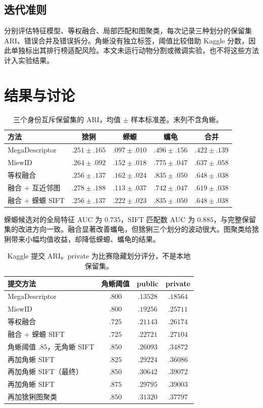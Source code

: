 \documentclass[UTF8,a4paper,10pt]{ctexart}
\begin{document}
\subsection{迭代准则}
分别评估特征模型、等权融合、局部匹配和图聚类，每次记录三种划分的保留集 ARI、错误合并及错误拆分。角蜥没有独立标签，阈值比较借助 Kaggle 分数，因此单独标出其排行榜适配风险。本文未运行动物分割或微调实验，也不将这些方法计入实验结果。

\section{结果与讨论}
\begin{table}[ht]
\centering
\caption{三个身份互斥保留集的 ARI，均值 $\pm$ 样本标准差。末列不含角蜥。}
\small
\begin{tabular}{lcccc}
\toprule
方法 & 猞猁 & 蝾螈 & 蠵龟 & 合并 \\
\midrule
MegaDescriptor & $.251\pm.165$ & $.097\pm.010$ & $.496\pm.156$ & $.422\pm.139$ \\
MiewID & $.264\pm.092$ & $.152\pm.018$ & $.775\pm.047$ & $.637\pm.058$ \\
等权融合 & $.256\pm.137$ & $.162\pm.024$ & $.835\pm.050$ & $.648\pm.038$ \\
融合 + 互近邻图 & $.278\pm.188$ & $.113\pm.037$ & $.742\pm.047$ & $.619\pm.038$ \\
融合 + 蝾螈 SIFT & $.256\pm.137$ & $.222\pm.023$ & $.835\pm.050$ & $.648\pm.038$ \\
\bottomrule
\end{tabular}
\end{table}

蝾螈候选对的全局特征 AUC 为 $0.735$，SIFT 匹配数 AUC 为 $0.885$，与完整保留集的改进方向一致。融合显著改善蠵龟，但猞猁三个划分的波动很大。图聚类给猞猁带来小幅均值收益，却降低蝾螈、蠵龟的结果。

\begin{table}[ht]
\centering
\caption{Kaggle 提交 ARI。private 为比赛隐藏划分评分，不是本地保留集。}
\small
\begin{tabular}{lccc}
\toprule
提交方法 & 角蜥阈值 & public & private \\
\midrule
MegaDescriptor & $.800$ & $.13528$ & $.18564$ \\
MiewID & $.800$ & $.19256$ & $.25711$ \\
等权融合 & $.725$ & $.21143$ & $.26174$ \\
融合 + 蝾螈 SIFT & $.725$ & $.22721$ & $.27104$ \\
角蜥阈值 $.85$，无角蜥 SIFT & $.850$ & $.26093$ & $.34872$ \\
再加角蜥 SIFT & $.825$ & $.29224$ & $.36086$ \\
再加角蜥 SIFT（最终） & $.850$ & $\mathbf{.30642}$ & $\mathbf{.39072}$ \\
再加角蜥 SIFT & $.875$ & $.29795$ & $.39003$ \\
再加猞猁图聚类 & $.850$ & $.31320$ & $.37797$ \\
\bottomrule
\end{tabular}
\end{table}
\end{document}
